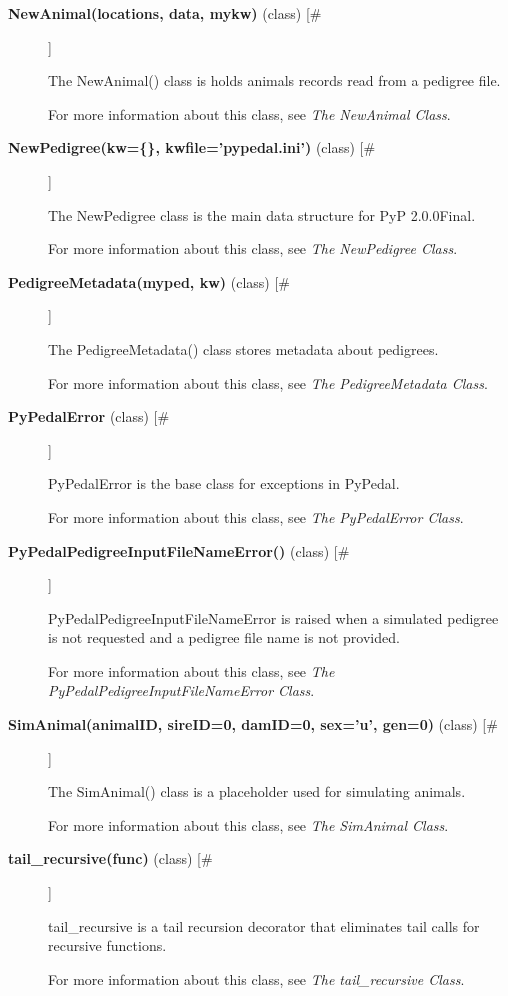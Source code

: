\documentclass{article}
\begin{document}
\begin{description}
\item[\textbf{NewAnimal(locations, data, mykw)} (class) [\#]
]
\par The NewAnimal() class is holds animals records read from a pedigree file.
\par For more information about this class, see \textit{The NewAnimal Class}.

\item[\textbf{NewPedigree(kw=\{\}, kwfile='pypedal.ini')} (class) [\#]
]
\par The NewPedigree class is the main data structure for PyP 2.0.0Final.
\par For more information about this class, see \textit{The NewPedigree Class}.

\item[\textbf{PedigreeMetadata(myped, kw)} (class) [\#]
]
\par The PedigreeMetadata() class stores metadata about pedigrees.
\par For more information about this class, see \textit{The PedigreeMetadata Class}.

\item[\textbf{PyPedalError} (class)  [\#]
]
\par PyPedalError is the base class for exceptions in PyPedal.
\par For more information about this class, see \textit{The PyPedalError Class}.

\item[\textbf{PyPedalPedigreeInputFileNameError()} (class) [\#]
]
\par PyPedalPedigreeInputFileNameError is raised when a simulated pedigree
is not requested and a pedigree file name is not provided.
\par For more information about this class, see \textit{The PyPedalPedigreeInputFileNameError Class}.

\item[\textbf{SimAnimal(animalID, sireID=0, damID=0, sex='u', gen=0)} (class) [\#]
]
\par The SimAnimal() class is a placeholder used for simulating animals.
\par For more information about this class, see \textit{The SimAnimal Class}.

\item[\textbf{tail\_recursive(func)} (class) [\#]
]
\par tail\_recursive is a tail recursion decorator that eliminates tail calls
for recursive functions.
\par For more information about this class, see \textit{The tail\_recursive Class}.

\end{description}
\end{document}
